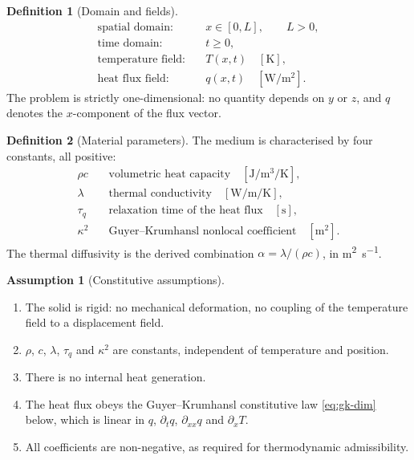 \documentclass[11pt,a4paper]{article}
\theoremstyle{definition}
\newtheorem{definitionx}{Definition}[section]
\newtheorem{assumptionx}{Assumption}[section]
\newcommand{\tq}{\tau_{q}}
\newcommand{\kk}{\kappa^{2}}
\begin{document}
\begin{definitionx}[Domain and fields]
\label{def:domain}
\begin{align}
  \text{spatial domain:}&\quad x \in [0,L], \qquad L>0 ,
  \label{eq:domain}\\
  \text{time domain:}&\quad t \geq 0 ,
  \label{eq:time}\\
  \text{temperature field:}&\quad T(x,t) \quad [\si{\kelvin}] ,
  \label{eq:Tfield}\\
  \text{heat flux field:}&\quad q(x,t) \quad
     [\si{\watt\per\metre\squared}] .
  \label{eq:qfield}
\end{align}
The problem is strictly one-dimensional: no quantity depends on $y$ or $z$, and
$q$ denotes the $x$-component of the flux vector.
\end{definitionx}

\begin{definitionx}[Material parameters]
\label{def:params}
The medium is characterised by four constants, all positive:
\begin{align}
  \rho c &\quad \text{volumetric heat capacity}
          \quad [\si{\joule\per\metre\cubed\per\kelvin}] ,
  \label{eq:rhoc}\\
  \lambda &\quad \text{thermal conductivity}
          \quad [\si{\watt\per\metre\per\kelvin}] ,
  \label{eq:lambda}\\
  \tq &\quad \text{relaxation time of the heat flux}
          \quad [\si{\second}] ,
  \label{eq:tauq}\\
  \kk &\quad \text{Guyer--Krumhansl nonlocal coefficient}
          \quad [\si{\metre\squared}] .
  \label{eq:kappa2}
\end{align}
The thermal diffusivity is the derived combination
$\alpha=\lambda/(\rho c)$, in \si{\metre\squared\per\second}.
\end{definitionx}

\begin{assumptionx}[Constitutive assumptions]
\label{ass:const}
\begin{enumerate}[nosep,label=(A\arabic*)]
  \item The solid is rigid: no mechanical deformation, no coupling of the
        temperature field to a displacement field.
  \item $\rho$, $c$, $\lambda$, $\tq$ and $\kk$ are constants, independent of
        temperature and position.
  \item There is no internal heat generation.
  \item The heat flux obeys the Guyer--Krumhansl constitutive law
        \eqref{eq:gk-dim} below, which is linear in $q$, $\partial_{t}q$,
        $\partial_{xx}q$ and $\partial_{x}T$.
  \item All coefficients are non-negative, as required for thermodynamic
        admissibility.
\end{enumerate}
\end{assumptionx}
\end{document}

